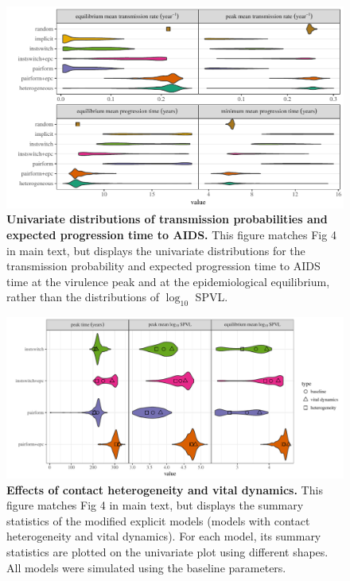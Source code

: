\documentclass[10pt,letterpaper]{article}
\newcommand{\Lspvl}{$\log_{10}$ SPVL}
\begin{document}
\clearpage

\begin{figure}[!ht]
  \includegraphics[width=\textwidth]{../figures/fig_S2_3.pdf}
\caption{{\bf Univariate distributions of transmission probabilities and expected progression time to AIDS.}
This figure matches Fig 4 in main text, but displays the
univariate distributions for the transmission probability and expected progression time to AIDS time at the virulence
peak and at the epidemiological equilibrium,
rather than the distributions of \Lspvl.
}
\label{fig:trandursum}
\end{figure}

\clearpage

\begin{figure}[!ht]
  \includegraphics[width=\textwidth]{../figures/fig_S2_4.pdf}
\caption{{\bf Effects of contact heterogeneity and vital dynamics.}
This figure matches Fig 4 in main text, but displays the
summary statistics of the modified explicit models (models with contact heterogeneity and vital dynamics).
For each model, its summary statistics are plotted on the univariate plot using different shapes.
All models were simulated using the baseline parameters.
}
\label{fig:fig3aug}
\end{figure}
\end{document}
